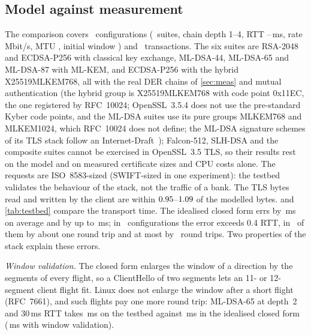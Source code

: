 \documentclass[preprint,12pt]{elsarticle}
\newcommand{\ms}{\,ms\xspace}
\begin{document}
\subsection{Model against measurement}
The comparison covers \tbNConfigs\ configurations (\tbNSuites\ suites, chain depth 1--4, RTT \tbRttLo--\tbRttHi\ms, rate \tbRates\,Mbit/s, MTU \tbMtus, initial window \tbIcws) and \tbNTrans\ transactions. The six suites are RSA-2048 and ECDSA-P256 with classical key exchange, ML-DSA-44, ML-DSA-65 and ML-DSA-87 with ML-KEM, and ECDSA-P256 with the hybrid X25519MLKEM768, all with the real DER chains of \cref{sec:meas} and mutual authentication (the hybrid group is X25519MLKEM768 with code point 0x11EC, the one registered by RFC~10024; OpenSSL~3.5.4 does not use the pre-standard Kyber code points, and the ML-DSA suites use its pure groups MLKEM768 and MLKEM1024, which RFC~10024 does not define; the ML-DSA signature schemes of its TLS stack follow an Internet-Draft~\cite{tlsmldsa}); Falcon-512, SLH-DSA and the composite suites cannot be exercised in OpenSSL~3.5 TLS, so their results rest on the model and on measured certificate sizes and CPU costs alone. The requests are ISO~8583-sized (SWIFT-sized in one experiment): the testbed validates the behaviour of the stack, not the traffic of a bank. The TLS bytes read and written by the client are within $0.95$--$1.09$ of the modelled bytes.  and \cref{tab:testbed} compare the transport time. The idealised closed form errs by \tbMaeIdeal\ms on average and by up to \tbMaxIdeal\ms; in \tbOffIdeal\ configurations the error exceeds 0.4 RTT, in \tbOffIdealOne\ of them by about one round trip and at most by \tbOffIdealMaxRtt\ round trips. Two properties of the stack explain these errors.

\emph{Window validation.} The closed form enlarges the window of a direction by the segments of every flight, so a ClientHello of two segments lets an 11- or 12-segment client flight fit. Linux does not enlarge the window after a short flight (RFC~7661), and such flights pay one more round trip: ML-DSA-65 at depth~2 and 30\ms RTT takes \tbWinMeas\ms on the testbed against \tbWinIdeal\ms in the idealised closed form (\tbWinLinux\ms with window validation).
\end{document}
